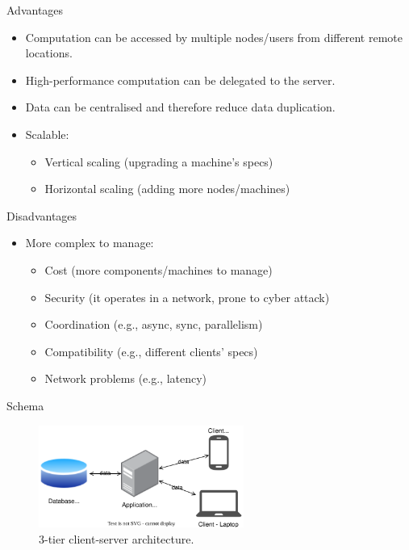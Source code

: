 \documentclass[aspectratio=169, table]{beamer}
\begin{document}
	\begin{frame}{Advantages}
		\begin{itemize}
			\item Computation can be accessed by multiple nodes/users from different remote locations.
			\item High-performance computation can be delegated to the server.
			\item Data can be centralised and therefore reduce data duplication.
			\item Scalable:
			\begin{itemize}
				\item Vertical scaling (upgrading a machine's specs)
				\item Horizontal scaling (adding more nodes/machines)
			\end{itemize}
		\end{itemize}
	\end{frame}

	\begin{frame}{Disadvantages}
		\begin{itemize}
			\item More complex to manage:
			\begin{itemize}
				\item Cost (more components/machines to manage)
				\item Security (it operates in a network, prone to cyber attack)
				\item Coordination (e.g., async, sync, parallelism)
				\item Compatibility (e.g., different clients' specs)
				\item Network problems (e.g., latency)
			\end{itemize}
		\end{itemize}
	\end{frame}

	\begin{frame}{Schema}
		\begin{figure}[h]
			\centering
			\includegraphics[width=0.6\textwidth]{client-server-3-tier}
			\caption{3-tier client-server architecture.}
			\label{fig:client-server-schema}
		\end{figure}
	\end{frame}
\end{document}
